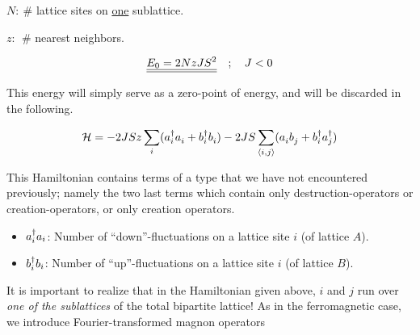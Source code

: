 \begin{description}
    \item $N: \ \#$ lattice sites on \uline{one} sublattice.
    \item $z:\ \ \#$ nearest neighbors.
\end{description}

\begin{equation}
    \uline{\uline{E_0 = 2NzJS^2}} \quad ; \quad J < 0
\end{equation}

This energy will simply serve as a zero-point of energy, and will be discarded in the following.

\begin{tcolorbox}
    \begin{equation}
        \mathcal{H} = -2JSz\sum_i (a_i^\dagger a_i^{} + b_i^\dagger b_i^{}) - 2JS \sum_{\langle i, j \rangle} (a_i^{} b_j^{} + b_i^\dagger a_j^\dagger)
    \end{equation}
\end{tcolorbox}

This Hamiltonian contains terms of a type that we have not encountered previously; namely the two last terms which contain only destruction-operators or creation-operators,
or only creation operators. 

\begin{itemize}
\item $a^{\dagger}_i a_i$: Number of ``down''-fluctuations on a lattice site $i$ (of lattice $A$).
\item $b^{\dagger}_i b_i$: Number of ``up''-fluctuations on a lattice site $i$ (of lattice $B$).
\end{itemize}
It is important to realize that in the Hamiltonian given above, $i$ and $j$ run over \emph{one of the sublattices} of the total bipartite lattice!
As in the ferromagnetic case, we introduce Fourier-transformed magnon operators

